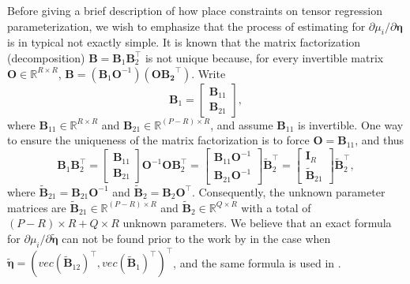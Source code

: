 Before giving a brief description of how
\citet{ChangYang2021bioinformatics} place constraints on tensor
regression parameterization, we wish to emphasize that the process of
estimating for \(\partial \mu_i / \partial \boldsymbol{\eta}\) is in
typical not exactly simple. It is known that the matrix factorization
(decomposition) \(\mathbf{B}=\mathbf{B}_1\mathbf{B}_2^{\top}\) is not
unique because, for every invertible matrix
\(\mathbf{O} \in \mathbb{R}^{R\times R}\),
\(\mathbf{B} = \left(\mathbf{B}_1\mathbf{O}^{-1}\right)\left(\mathbf{O}\mathbf{B_2}^{\top}\right)\).
Write \[
  \mathbf{B}_1=\left[\begin{array}{c}
    \mathbf{B}_{11} \\ \mathbf{B}_{21}
  \end{array}\right],
\] where \(\mathbf{B}_{11} \in \mathbb{R}^{R\times R}\) and
\(\mathbf{B}_{21} \in \mathbb{R}^{(P-R)\times R}\), and assume
\(\mathbf{B}_{11}\) is invertible. One way to ensure the uniqueness of
the matrix factorization is to force \(\mathbf{O}=\mathbf{B}_{11}\), and
thus \[
  \mathbf{B}_1\mathbf{B}_2^\top=\left[\begin{array}{c}
    \mathbf{B}_{11} \\ \mathbf{B}_{21}
  \end{array}\right] \mathbf{O}^{-1}\mathbf{O}\mathbf{B}_2^{\top}
  =\left[\begin{array}{c}
    \mathbf{B}_{11}\mathbf{O}^{-1} \\ \mathbf{B}_{21}\mathbf{O}^{-1}
  \end{array}\right] \tilde{\mathbf{B}}_2^{\top}
  = \left[\begin{array}{c}
    \mathbf{I}_R \\ \tilde{\mathbf{B}}_{21} 
  \end{array}\right] \tilde{\mathbf{B}}_2^{\top},
\] where \(\tilde{\mathbf{B}}_{21}={\mathbf{B}}_{21}\mathbf{O}^{-1}\)
and \(\tilde{\mathbf{B}}_{2}={\mathbf{B}}_{2}\mathbf{O}^{\top}\).
Consequently, the unknown parameter matrices are
\(\tilde{\mathbf{B}}_{21} \in \mathbb{R}^{(P-R)\times R}\) and
\(\tilde{\mathbf{B}}_2 \in \mathbb{R}^{Q\times R}\) with a total of
\((P-R)\times R + Q\times R\) unknown parameters. We believe that an
exact formula for
\(\partial \mu_i / \partial \tilde{\boldsymbol{\eta}}\) can not be found
prior to the work by \citet{ChangYang2021bioinformatics} in the case
when
\(\tilde{\boldsymbol{\eta}} = (vec(\tilde{\mathbf{B}}_{12})^{\top}, vec(\tilde{\mathbf{B}}_1)^{\top})^{\top}\),
and the same formula is used in .

